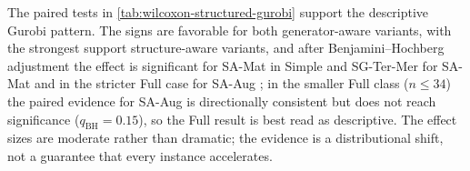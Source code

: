 \documentclass[AMA,Times1COL]{WileyNJDv5} %
\newcommand{\methodAug}{SA-Aug}
\newcommand{\methodMat}{SA-Mat}
\providecommand{\DIFadd}[1]{{\protect\color{blue} \sf #1}} %
\providecommand{\DIFdel}[1]{{\protect\color{red} \scriptsize #1}} %
\providecommand{\DIFaddbegin}{} %
\providecommand{\DIFaddend}{} %
\providecommand{\DIFdelbegin}{} %
\providecommand{\DIFdelend}{} %
\begin{document}
\noindent The paired tests in \cref{tab:wilcoxon-structured-gurobi} support the descriptive Gurobi pattern. The signs are favorable for both \DIFdelbegin \DIFdel{generator-aware variants, with the strongest support }\DIFdelend \DIFaddbegin \DIFadd{structure-aware variants, and after Benjamini--Hochberg adjustment the effect is significant for \methodMat{} }\DIFaddend in Simple and SG-Ter-Mer\DIFdelbegin \DIFdel{for \methodMat{} and in the stricter Full case for \methodAug{} }\DIFdelend \DIFaddbegin \DIFadd{; in the smaller Full class ($n\!\le\!34$) the paired evidence for \methodAug{} is directionally consistent but does not reach significance ($q_{\mathrm{BH}}=0.15$), so the Full result is best read as descriptive}\DIFaddend . The effect sizes are moderate rather than dramatic; the evidence is a distributional shift, not a guarantee that every instance accelerates.
\end{document}

